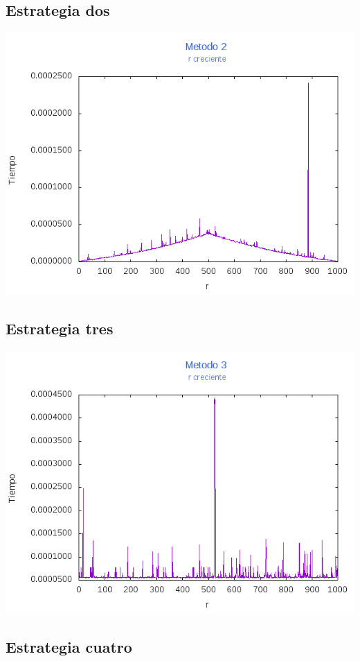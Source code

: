 \documentclass[12pt,letterpaper]{scrartcl}
\begin{document}
\subsection{Estrategia dos}

\includegraphics[scale=1]{Metodo2/plot1m2}

\subsection{Estrategia tres}

\includegraphics[scale=1]{Metodo3/plot1m3}

\subsection{Estrategia cuatro}
\end{document}
